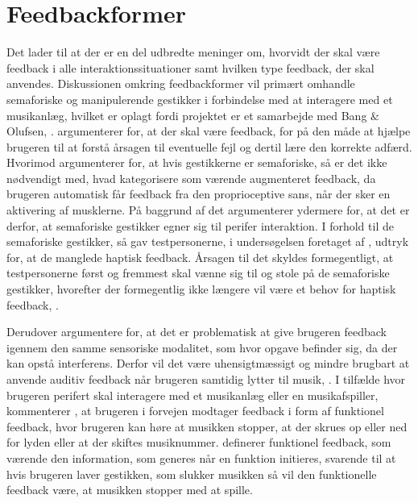 \section{Feedbackformer}
\label{Feedbackformer}
%
Det lader til at der er en del udbredte meninger om, hvorvidt der skal være feedback i alle interaktionssituationer samt hvilken type feedback, der skal anvendes. Diskussionen omkring feedbackformer vil primært omhandle semaforiske og manipulerende gestikker i forbindelse med at interagere med et musikanlæg, hvilket er oplagt fordi projektet er et samarbejde med Bang $\&$ Olufsen, . \blankline
%
\textcite[s. 10]{PDF:NaturalUserInterfaces} argumenterer for, at der skal være feedback, for på den måde at hjælpe brugeren til at forstå årsagen til eventuelle fejl og dertil lære den korrekte adfærd. Hvorimod \textcite[s. 16]{PDF:PIEmbeddingHCIOnTheRelevance} argumenterer for, at hvis gestikkerne er semaforiske, så er det ikke nødvendigt med, hvad \textcite[s. 16]{PDF:PIEmbeddingHCIOnTheRelevance} kategorisere som værende augmenteret feedback, da brugeren automatisk får feedback fra den proprioceptive sans, når der sker en aktivering af musklerne. På baggrund af det argumenterer \textcite[s. 16]{PDF:PIEmbeddingHCIOnTheRelevance} ydermere for, at det er derfor, at semaforiske gestikker egner sig til perifer interaktion. I forhold til de semaforiske gestikker, så gav testpersonerne, i undersøgelsen foretaget af \textcite[ss. 172-173]{PDF:ComparingInputModalities}, udtryk for, at de manglede haptisk feedback. Årsagen til det skyldes formegentligt, at testpersonerne først og fremmest skal vænne sig til og stole på de semaforiske gestikker, hvorefter der formegentlig ikke længere vil være et behov for haptisk feedback, \parencite[s. 174]{PDF:ComparingInputModalities}. 

Derudover argumentere \textcite[s. 3]{PDF:FacilitatingPIDesignAndEvaluation} for, at det er problematisk at give brugeren feedback igennem den samme sensoriske modalitet, som hvor opgave befinder sig, da der kan opstå interferens. Derfor vil det være uhensigtmæssigt og mindre brugbart at anvende auditiv feedback når brugeren samtidig lytter til musik, \parencite[s. 3]{PDF:FacilitatingPIDesignAndEvaluation}. I tilfælde hvor brugeren perifert skal interagere med et musikanlæg eller en musikafspiller, kommenterer \textcite[s. 19]{PDF:PIEmbeddingHCIOnTheRelevance}, at brugeren i forvejen modtager feedback i form af funktionel feedback, hvor brugeren kan høre at musikken stopper, at der skrues op eller ned for lyden eller at der skiftes musiknummer. \textcite[s. 3]{PDF:InteractionFrogger} definerer funktionel feedback, som værende den information, som generes når en funktion initieres, svarende til at hvis brugeren laver gestikken, som slukker musikken så vil den funktionelle feedback være, at musikken stopper med at spille. 

